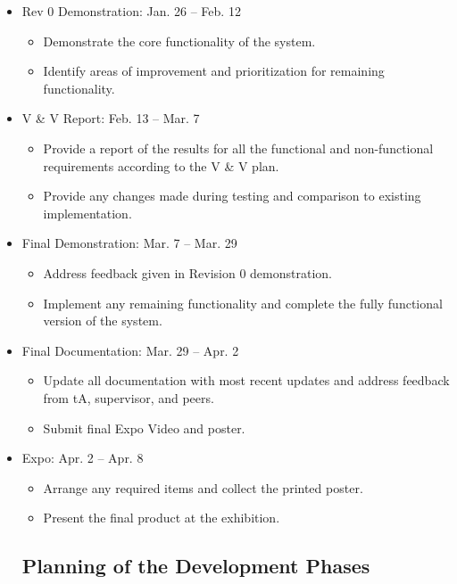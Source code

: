 \documentclass[12pt]{article}
\begin{document}
\begin{itemize}
\begin{itemize}
  \item Rev 0 Demonstration: Jan. 26 -- Feb. 12
  \begin{itemize}
    \item Demonstrate the core functionality of the system.
    \item Identify areas of improvement and prioritization for remaining functionality.
  \end{itemize}

  \item V & V Report: Feb. 13 -- Mar. 7 
  \begin{itemize}
    \item Provide a report of the results for all the functional and non-functional requirements according to the V & V plan.
    \item Provide any changes made during testing and comparison to existing implementation.
  \end{itemize}
  
  \item Final Demonstration: Mar. 7 -- Mar. 29 
  \begin{itemize}
    \item Address feedback given in Revision 0 demonstration.
    \item Implement any remaining functionality and complete the fully functional version of the system.
  \end{itemize}

  \item Final Documentation: Mar. 29 -- Apr. 2 
  \begin{itemize}
    \item Update all documentation with most recent updates and address feedback from tA, supervisor, and peers.
    \item Submit final Expo Video and poster.
  \end{itemize}

  \item Expo: Apr. 2 -- Apr. 8 
  \begin{itemize}
    \item Arrange any required items and collect the printed poster. 
    \item Present the final product at the exhibition.
  \end{itemize}

\subsection{Planning of the Development Phases}


\end{itemize}
\end{itemize}
\end{document}
